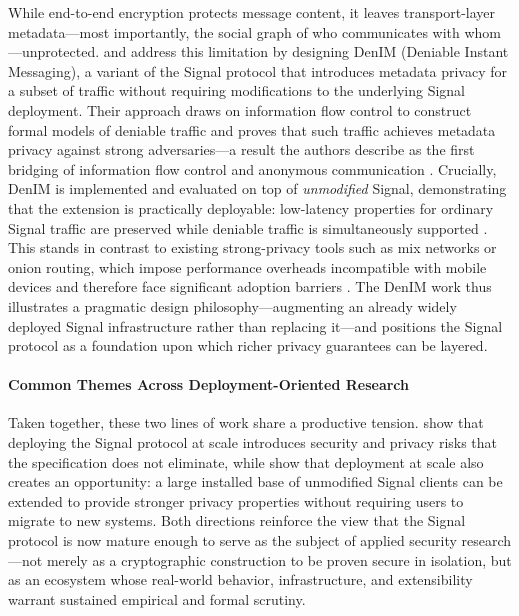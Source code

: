 While end-to-end encryption protects message content, it leaves transport-layer metadata—most importantly, the social graph of who communicates with whom—unprotected. \textcite{nelson2024} and \textcite{nelson2022} address this limitation by designing DenIM (Deniable Instant Messaging), a variant of the Signal protocol that introduces metadata privacy for a subset of traffic without requiring modifications to the underlying Signal deployment. Their approach draws on information flow control to construct formal models of deniable traffic and proves that such traffic achieves metadata privacy against strong adversaries—a result the authors describe as the first bridging of information flow control and anonymous communication \parencite{nelson2022}. Crucially, DenIM is implemented and evaluated on top of \emph{unmodified} Signal, demonstrating that the extension is practically deployable: low-latency properties for ordinary Signal traffic are preserved while deniable traffic is simultaneously supported \parencite{nelson2024}. This stands in contrast to existing strong-privacy tools such as mix networks or onion routing, which impose performance overheads incompatible with mobile devices and therefore face significant adoption barriers \parencite{nelson2022}. The DenIM work thus illustrates a pragmatic design philosophy—augmenting an already widely deployed Signal infrastructure rather than replacing it—and positions the Signal protocol as a foundation upon which richer privacy guarantees can be layered.

\paragraph{Common Themes Across Deployment-Oriented Research}

Taken together, these two lines of work share a productive tension. \textcite{gegenhuber2025} show that deploying the Signal protocol at scale introduces security and privacy risks that the specification does not eliminate, while \textcite{nelson2024} show that deployment at scale also creates an opportunity: a large installed base of unmodified Signal clients can be extended to provide stronger privacy properties without requiring users to migrate to new systems. Both directions reinforce the view that the Signal protocol is now mature enough to serve as the subject of applied security research—not merely as a cryptographic construction to be proven secure in isolation, but as an ecosystem whose real-world behavior, infrastructure, and extensibility warrant sustained empirical and formal scrutiny.

